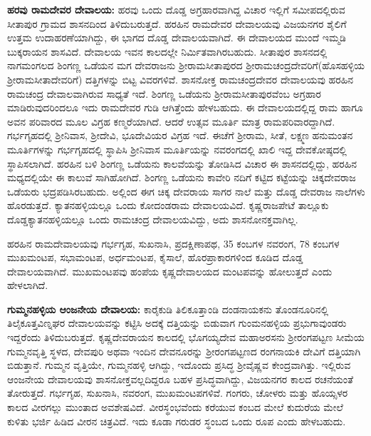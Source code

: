 \textbf{ಹರವು ರಾಮದೇವರ ದೇವಾಲಯ:} ಹರವು ಒಂದು ದೊಡ್ಡ ಅಗ್ರಹಾರವಾಗಿದ್ದ ವಿಚಾರ ಇಲ್ಲಿಗೆ ಸಮೀಪದಲ್ಲಿರುವ ಸೀತಾಪುರ ಗ್ರಾಮದ ಶಾಸನದಿಂದ ತಿಳಿದುಬರುತ್ತದೆ. ಹರಹಿನ ರಾಮದೇವರ ದೇವಾಲಯವು ವಿಜಯನಗರ ಶೈಲಿಗೆ ಉತ್ತಮ ಉದಾಹರಣೆಯಾಗಿದ್ದು, ಈ ಭಾಗದ ದೊಡ್ಡ ದೇವಾಲಯವಾಗಿದೆ. ಈ ದೇವಾಲಯದ ಮುಂದೆ ಇಮ್ಮಡಿ ಬುಕ್ಕರಾಯನ ಶಾಸವಿದೆ. ದೇವಾಲಯ ಇವನ ಕಾಲದಲ್ಲೇ ನಿರ್ಮಿತವಾಗಿರಬಹುದು. ಸೀತಾಪುರ ಶಾಸನದಲ್ಲಿ ನಾಗಮಂಗಲದ ಶಿಂಗಣ್ಣ ಒಡೆಯನ ಮಗ ದೇವರಾಜನು ಶ‍್ರೀರಾಮಸೀತಾಪುರದ ಶ‍್ರೀರಾಮಚಂದ್ರದೇವರಿಗೆ(ಹೊಸಹಳ್ಳಿಯ ಶ‍್ರೀರಾಮಸೀತಾದೇವರಿಗೆ) ದತ್ತಿಗಳನ್ನು ಬಿಟ್ಟ ವಿವರಗಳಿವೆ. ಶಾಸನೋಕ್ತ ರಾಮಚಂದ್ರದೇವರ ದೇವಾಲಯವು ಹರಹಿನ ರಾಮಚಂದ್ರ ದೇವಾಲವಾಗಿರುವ ಸಾಧ್ಯತೆ ಇದೆ. ಶಿಂಗಣ್ಣ ಒಡೆಯನು ಶ‍್ರೀರಾಮಸೀತಾಪುರವೆಂಬ ಅಗ್ರಹಾರ ಮಾಡಿರುವುದರಿಂದಲೂ ಇದು ರಾಮದೇವರ ಗುಡಿ ಆಗಿತ್ತೆಂದು ಹೇಳಬಹುದು. ಈ ದೇವಾಲಯದಲ್ಲಿದ್ದ ರಾಮ ಹಾಗೂ ಅವನ ಪರಿವಾರದ ಮೂಲ ವಿಗ್ರಹ ಕಣ್ಮರೆಯಾಗಿದೆ. ಆದರೆ ಉತ್ಸವ ಮೂರ್ತಿ ಮಾತ್ರ ರಾಮಪರಿವಾರದ್ದಾಗಿದೆ. ಗರ್ಭಗೃಹದಲ್ಲಿ ಶ‍್ರೀನಿವಾಸ, ಶ‍್ರೀದೇವಿ, ಭೂದೇವಿಯರ ವಿಗ್ರಹ ಇದೆ. ಈಚೆಗೆ ಶ‍್ರೀರಾಮ, ಸೀತೆ, ಲಕ್ಷ್ಮಣ ಹನುಮಂತನ ಮೂರ್ತಿಗಳನ್ನು ಗರ್ಭಗೃಹದಲ್ಲಿ ಸ್ಥಾಪಿಸಿ ಶ‍್ರೀನಿವಾಸ ಮೂರ್ತಿಯನ್ನು ನವರಂಗದಲ್ಲಿ ಖಾಲಿ ಇದ್ದ ದೇವಕೋಷ್ಠದಲ್ಲಿ ಸ್ಥಾಪಿಸಲಾಗಿದೆ. ಹರಹಿನ ಬಳಿ ಶಿಂಗಣ್ಣ ಒಡೆಯನು ಕಾಲವೆಯನ್ನು ತೋಡಿಸಿದ ವಿಚಾರ ಈ ಶಾಸನದಲ್ಲಿದ್ದು, ಹರಹಿನ ಮಧ್ಯದಲ್ಲಿಯೇ ಈ ಕಾಲುವೆ ಸಾಗಿಹೋಗಿದೆ. ಶಿಂಗಣ್ಣ ಒಡೆಯನು ಕಾವೇರಿ ನದಿಗೆ ಕಟ್ಟಿದ ಕಟ್ಟೆಯನ್ನು ಚಿಕ್ಕದೇವರಾಜ ಒಡೆಯರು ಭದ್ರಪಡಿಸಿರಬಹುದು. ಅಲ್ಲಿಂದ ಈಗ ಚಿಕ್ಕ ದೇವರಾಯ ಸಾಗರ ನಾಲೆ ಮತ್ತು ದೊಡ್ಡ ದೇವರಾಜ ನಾಲೆ\-ಗಳು ಹೊರಡುತ್ತದೆ. ಕ್ಯಾತನಹಳ್ಳಿಯಲ್ಲೂ ಒಂದು ಕೋದಂಡರಾಮ ದೇವಾಲಯವಿದೆ. ಕೃಷ್ಣರಾಜಪೇಟೆ ತಾಲ್ಲೂಕು ದೊಡ್ಡಕ್ಯಾತನಹಳ್ಳಿಯಲ್ಲೂ ಒಂದು ರಾಮಚಂದ್ರ ದೇವಾಲಯವಿದ್ದು, ಅದು ಶಾಸನೋನಕ್ತವಾಗಿಲ್ಲ.

\vskip 3pt

ಹರಹಿನ ರಾಮದೇವಾಲಯವು ಗರ್ಭಗೃಹ, ಸುಖನಾಸಿ, ಪ್ರದಕ್ಷಿಣಾಪಥ, 35 ಕಂಬಗಳ ನವರಂಗ, 78 ಕಂಬಗಳ ಮುಖಮಂಟಪ, ಸಭಾಮಂಟಪ, ಅರ್ಧಮಂಟಪ, ಕೈಸಾಲೆ, ಹೊರಪ್ರಾಕಾರಗಳಿಂದ ಕೂಡಿದ ದೊಡ್ಡ ದೇವಾಲಯವಾಗಿದೆ. ಮುಖಮಂಟಪವು ಹಂಪೆಯ ಕೃಷ್ಣದೇವಾಲಯದ ಮಂಟಪವನ್ನು ಹೋಲುತ್ತದೆ ಎಂದು ಹೇಳಲಾಗಿದೆ.

\vskip 3pt

\textbf{ಗುಮ್ಮನಹಳ್ಳಿಯ ಆಂಜನೇಯ ದೇವಾಲಯ: } ಕಾರೈಕುಡಿ ತಿಲಿಕೂತ್ತಾಂಡಿ ದಂಡನಾಯಕನು ತೊಂಡನೂರಿನಲ್ಲಿ ತಿಲೈಕೂತ್ತವಿಣ್ನಘರ ದೇವಾಲಯವನ್ನು ಕಟ್ಟಿಸಿ ಅದಕ್ಕೆ ದತ್ತಿಯನ್ನು ಬಿಡುವಾಗ ಗುಂಮನಹಳ್ಳಿಯ ಪ್ರಭುಗಾವುಂಡರು ಇದ್ದರೆಂದು ತಿಳಿದುಬರುತ್ತದೆ. ಕೃಷ್ಣದೇವರಾಯನ ಕಾಲದಲ್ಲಿ ಭೊಗಯ್ಯದೇವ ಮಹಾಅರಸನು ಶ‍್ರೀರಂಗಪಟ್ಟಣ ಸೀಮೆಯ ಗುಮ್ಮನವೃತ್ತಿ ಸ್ಥಳದ, ದೇವಪುರಿ ಅಥವಾ ಇಂದಿನ ದೇವನೂರನ್ನು ಶ‍್ರೀರಂಗಪಟ್ಟಣದ ರಂಗನಾಯಕಿ ದೇವಿಗೆ ದತ್ತಿಯಾಗಿ ಬಿಡುತ್ತಾನೆ. ಗುಮ್ಮನ ವೃತ್ತಿಯೇ, ಗುಮ್ಮನಹಳ್ಳಿ ಆಗಿದ್ದು, ಇದೊಂದು ಪ್ರಸಿದ್ಧ ಶ‍್ರೀವೈಷ್ಣವ ಕೇಂದ್ರವಾಗಿತ್ತು. ಇಲ್ಲಿರುವ ಆಂಜನೇಯ ದೇವಾಲಯವು ಶಾಸನೋಕ್ತವಲ್ಲದಿದ್ದರೂ ಬಹಳ ಪ್ರಸಿದ್ಧವಾಗಿದ್ದು, ವಿಜಯನಗರ ಕಾಲದ ರಚನೆಯಂತೆ ತೋರುತ್ತದೆ. ಗರ್ಭಗೃಹ, ಸುಖನಾಸಿ, ನವರಂಗ, ಮುಖಮಂಟಪಗಳಿವೆ. ಗಂಗರು, ಚೋಳರು ಮತ್ತು ಹೊಯ್ಸಳರ ಕಾಲದ ವೀರಗಲ್ಲು ಮುಂತಾದ ಅವಶೇಷವಿದೆ. ವೀರಸ್ಥಂಭವೆಂದು ಕರೆಯುವ ಕಂಬದ ಮೇಲೆ ಕುದುರೆಯ ಮೇಲೆ ಕುಳಿತು ಭರ್ಜಿ ಹಿಡಿದ ವೀರನ ಚಿತ್ರವಿದೆ. ಇದು ಕೂಡಾ ಗರುಡರ ಸ್ಥಂಬದ ಒಂದು ರೂಪ ಎಂದು ಹೇಳಬಹುದು.

